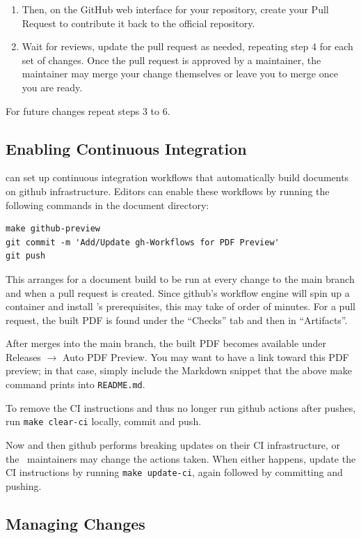 \documentclass[11pt,a4paper]{ivoa}
\begin{document}
\begin{enumerate}
\item  Then, on the GitHub web interface for your repository, create
your Pull Request to contribute it back to the official repository.

\item  Wait for reviews, update the pull request as needed, repeating step 4
for each set of changes. Once the pull request is approved by a maintainer,
the maintainer may merge your change themselves or leave you to merge
once you are ready.
\end{enumerate}

For future changes repeat steps 3 to 6.

\subsection{Enabling Continuous Integration}

\ivoatex{} can set up continuous integration workflows that
automatically build documents on github infrastructure.  Editors can
enable these workflows by running the following commands in the document
directory:

\begin{lstlisting}
make github-preview
git commit -m 'Add/Update gh-Workflows for PDF Preview'
git push
\end{lstlisting}

This arranges for a document build to be run at every change to the main
branch and when a pull request is created.  Since github's workflow
engine will spin up a container and install \ivoatex's
prerequisites, this may take of order of minutes.  For a pull
request, the built PDF is found under the ``Checks'' tab and then in
``Artifacts''.

After merges into the main branch, the built PDF becomes available under
Releases $\to$ Auto PDF Preview.  You may want to have a link toward
this PDF preview; in that case, simply include the Markdown snippet that
the above make command prints into \verb|README.md|.

To remove the CI instructions and thus no longer run github actions
after pushes, run \verb|make clear-ci| locally, commit and push.

Now and then github performs breaking updates on their CI
infrastructure, or the \ivoatex~maintainers may change the actions
taken.  When either happens, update the CI instructions by running
\verb|make update-ci|, again followed by committing and pushing.

\subsection{Managing Changes}
\label{sect:chmgt}
\end{document}
